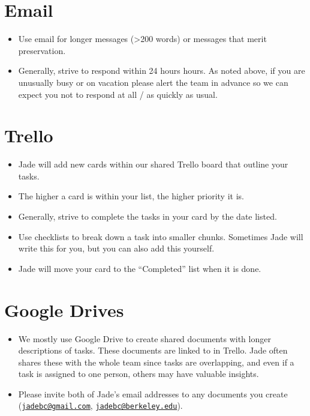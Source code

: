 \documentclass[]{book}
\providecommand{\tightlist}{%
  \setlength{\itemsep}{0pt}\setlength{\parskip}{0pt}}
\begin{document}
\section{Email}\label{email}

\begin{itemize}
\tightlist
\item
  Use email for longer messages (\textgreater{}200 words) or messages
  that merit preservation.
\item
  Generally, strive to respond within 24 hours hours. As noted above, if
  you are unusually busy or on vacation please alert the team in advance
  so we can expect you not to respond at all / as quickly as usual.
\end{itemize}

\section{Trello}\label{trello}

\begin{itemize}
\tightlist
\item
  Jade will add new cards within our shared Trello board that outline
  your tasks.
\item
  The higher a card is within your list, the higher priority it is.
\item
  Generally, strive to complete the tasks in your card by the date
  listed.
\item
  Use checklists to break down a task into smaller chunks. Sometimes
  Jade will write this for you, but you can also add this yourself.
\item
  Jade will move your card to the ``Completed'' list when it is done.
\end{itemize}

\section{Google Drives}\label{google-drives}

\begin{itemize}
\tightlist
\item
  We mostly use Google Drive to create shared documents with longer
  descriptions of tasks. These documents are linked to in Trello. Jade
  often shares these with the whole team since tasks are overlapping,
  and even if a task is assigned to one person, others may have valuable
  insights.
\item
  Please invite both of Jade's email addresses to any documents you
  create (\href{mailto:jadebc@gmail.com}{\nolinkurl{jadebc@gmail.com}},
  \href{mailto:jadebc@berkeley.edu}{\nolinkurl{jadebc@berkeley.edu}}).
\end{itemize}
\end{document}
